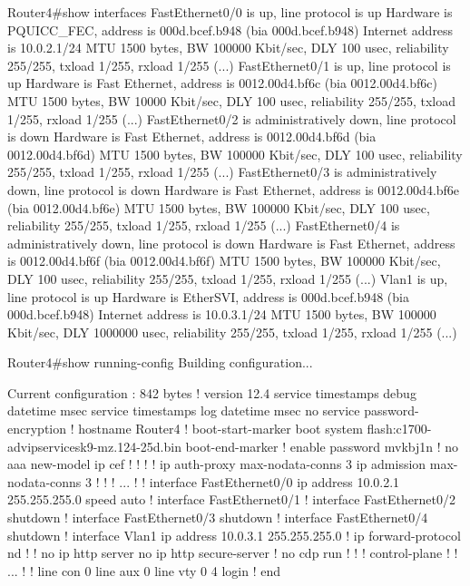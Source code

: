 Router4#show interfaces 
FastEthernet0/0 is up, line protocol is up 
  Hardware is PQUICC_FEC, address is 000d.bcef.b948 (bia 000d.bcef.b948)
  Internet address is 10.0.2.1/24
  MTU 1500 bytes, BW 100000 Kbit/sec, DLY 100 usec, 
     reliability 255/255, txload 1/255, rxload 1/255
  (...)
FastEthernet0/1 is up, line protocol is up 
  Hardware is Fast Ethernet, address is 0012.00d4.bf6c (bia 0012.00d4.bf6c)
  MTU 1500 bytes, BW 10000 Kbit/sec, DLY 100 usec, 
     reliability 255/255, txload 1/255, rxload 1/255
    (...)
FastEthernet0/2 is administratively down, line protocol is down 
  Hardware is Fast Ethernet, address is 0012.00d4.bf6d (bia 0012.00d4.bf6d)
  MTU 1500 bytes, BW 100000 Kbit/sec, DLY 100 usec, 
     reliability 255/255, txload 1/255, rxload 1/255
    (...)
FastEthernet0/3 is administratively down, line protocol is down 
  Hardware is Fast Ethernet, address is 0012.00d4.bf6e (bia 0012.00d4.bf6e)
  MTU 1500 bytes, BW 100000 Kbit/sec, DLY 100 usec, 
     reliability 255/255, txload 1/255, rxload 1/255
    (...)
FastEthernet0/4 is administratively down, line protocol is down 
  Hardware is Fast Ethernet, address is 0012.00d4.bf6f (bia 0012.00d4.bf6f)
  MTU 1500 bytes, BW 100000 Kbit/sec, DLY 100 usec, 
     reliability 255/255, txload 1/255, rxload 1/255
   (...)
Vlan1 is up, line protocol is up 
  Hardware is EtherSVI, address is 000d.bcef.b948 (bia 000d.bcef.b948)
  Internet address is 10.0.3.1/24
  MTU 1500 bytes, BW 100000 Kbit/sec, DLY 1000000 usec, 
     reliability 255/255, txload 1/255, rxload 1/255
    (...)


Router4#show running-config 
Building configuration...

Current configuration : 842 bytes
!
version 12.4
service timestamps debug datetime msec
service timestamps log datetime msec
no service password-encryption
!
hostname Router4
!
boot-start-marker
boot system flash:c1700-advipservicesk9-mz.124-25d.bin
boot-end-marker
!
enable password mvkbj1n
!
no aaa new-model
ip cef
!
!
!
!
ip auth-proxy max-nodata-conns 3
ip admission max-nodata-conns 3
!
!
!
...
!
!
interface FastEthernet0/0
 ip address 10.0.2.1 255.255.255.0
 speed auto
!
interface FastEthernet0/1
!
interface FastEthernet0/2
 shutdown
!
interface FastEthernet0/3
 shutdown
!
interface FastEthernet0/4
 shutdown
!
interface Vlan1
 ip address 10.0.3.1 255.255.255.0
!
ip forward-protocol nd
!
!
no ip http server
no ip http secure-server
!         
no cdp run
!
!
!
control-plane
!
!
...
!
!
line con 0
line aux 0
line vty 0 4
 login
!
end

